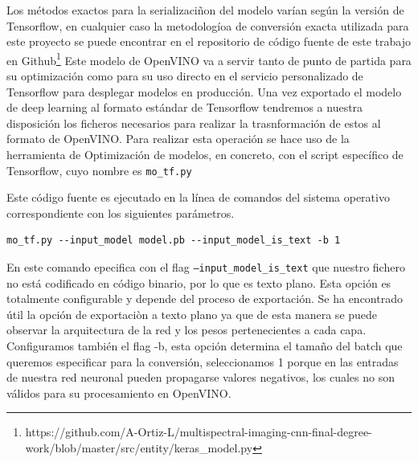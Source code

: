 Los métodos exactos para la serializaciñon del modelo varían según la versión de Tensorflow, en cualquier caso la metodologíoa de conversión exacta utilizada
para este proyecto se puede encontrar en el repositorio de código fuente de este trabajo en Github\footnote{https://github.com/A-Ortiz-L/multispectral-imaging-cnn-final-degree-work/blob/master/src/entity/keras_model.py}
Este modelo de OpenVINO va a servir tanto de punto de partida para su optimización como para su uso directo en el servicio personalizado de Tensorflow para desplegar
modelos en producción.
Una vez exportado el modelo de deep learning al formato estándar de Tensorflow tendremos a nuestra disposición los ficheros necesarios para realizar la trasnformación de estos al formato de OpenVINO.
Para realizar esta operación se hace uso de la herramienta de Optimización de modelos, en concreto, con el script específico de Tensorflow, cuyo nombre
es \texttt{mo\_tf.py}

Este código fuente es ejecutado en la línea de comandos del sistema operativo correspondiente con los siguientes parámetros.


\begin{lstlisting}[caption=Comando de terminal para convertir un modelo Tensorflow a uno de OpenVINO.,
  label=a_label,
  float=t]
    mo_tf.py --input_model model.pb --input_model_is_text -b 1
\end{lstlisting}

En este comando epecifica con el flag \texttt{--input\_model\_is\_text} que nuestro fichero no está codificado en código binario, por lo que es texto plano.
Esta opción es totalmente configurable y depende del proceso de exportación.
Se ha encontrado útil la opción de exportaciòn a texto plano ya que de esta manera
se puede observar la arquitectura de la red y los pesos pertenecientes a cada capa.
Configuramos también el flag -b, esta opción determina el tamaño del batch que queremos especificar para la conversión, seleccionamos 1 porque en las entradas de nuestra red neuronal pueden propagarse valores
negativos, los cuales no son válidos para su procesamiento en OpenVINO\@.

